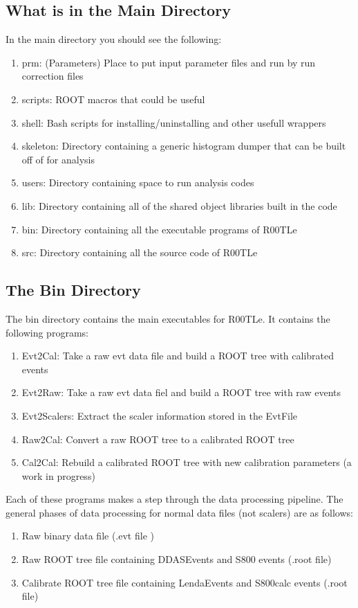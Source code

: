 \documentclass[paper=a4, fontsize=12pt]{scrartcl} %
\numberwithin{equation}{section} %
\numberwithin{figure}{section} %
\numberwithin{table}{section} %
\begin{document}
\subsection{What is in the Main Directory}
In the main directory you should see the following:
\begin{enumerate}
  \item prm: (Parameters) Place to put input parameter files and run by run correction files
  \item scripts: ROOT macros that could be useful
  \item shell: Bash scripts for installing/uninstalling and other usefull wrappers
  \item skeleton: Directory containing a generic histogram dumper that can be built off of for analysis
  \item users: Directory containing space to run analysis codes
  \item lib: Directory containing all of the shared object libraries built in the code
  \item bin: Directory containing all the executable programs of R00TLe
  \item src: Directory containing all the source code of R00TLe
\end{enumerate}

\subsection{The Bin Directory}
The bin directory contains the main executables for R00TLe.  It contains the following programs:
\begin{enumerate}
	\item Evt2Cal: Take a raw evt data file and build a ROOT tree with calibrated events
	\item Evt2Raw: Take a raw evt data fiel and build a ROOT tree with raw events
	\item Evt2Scalers: Extract the scaler information stored in the EvtFile
	\item Raw2Cal: Convert a raw ROOT tree to a calibrated ROOT tree
	\item Cal2Cal: Rebuild a calibrated ROOT tree with new calibration parameters (a work in progress)
\end{enumerate}

Each of these programs makes a step through the data processing pipeline.  The general phases of data processing for normal data files (not scalers) are as follows:
\begin{enumerate}
	\item Raw binary data file (.evt file )
	\item Raw ROOT tree file containing DDASEvents and S800 events (.root file)
	\item Calibrate ROOT tree file containing LendaEvents and S800calc events (.root file)
\end{enumerate}
\end{document}
